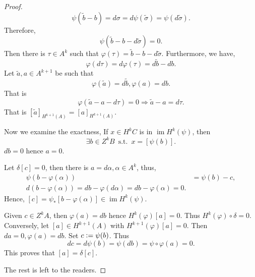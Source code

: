 \documentclass[8pt]{article}
\DeclareMathOperator{\straw}{s.t.}
\DeclareMathOperator{\image}{im}
\newcommand{\defeq}{\vcentcolon=}
\newcommand{\st}[0]{\:\straw\:}
\begin{document}
\begin{proof}
\begin{equation*}
    \psi(\tilde{b}-b) = d\sigma = d\psi(\tilde{\sigma}) = \psi(d\tilde{\sigma}).
  \end{equation*}
  Therefore,
  \begin{equation*}
    \psi(\tilde{b}-b-d\tilde{\sigma})=0.
  \end{equation*}
  Then there is $\tau\in A^k$ such that $\varphi(\tau) = \tilde{b}-b-d\tilde{\sigma}$. Furthermore, we have,
  \begin{equation*}
    \varphi(d\tau) = d\varphi(\tau)=d\tilde{b}-db.
  \end{equation*}
  Let $\tilde{a},a\in A^{k+1}$ be such that 
  \begin{equation*}
    \varphi(\tilde{a}) = d\tilde{b},\varphi(a) = db.
  \end{equation*}
  That is 
  \begin{equation*}
    \varphi(\tilde{a}-a-d\tau) = 0\Rightarrow \tilde{a}-a = d\tau.
  \end{equation*}
  That is $[\tilde{a}]_{H^{k+1}(A)} = [a]_{H^{k+1}(A)}$. 
  \par Now we examine the exactness,
  If $x\in H^kC$ is in $\image H^k(\psi)$, then 
  \begin{equation*}
    \exists b\in Z^kB\st x=[\psi(b)].
  \end{equation*}
  $db=0$ hence $a=0$.
  \par Let $\delta[c]=0$, then there is $a=d\alpha,\alpha\in A^k$, thus,
  \begin{align*}
    \psi(b-\varphi(\alpha))&=\psi(b)-c,\\
    d(b-\varphi(\alpha))=db-\varphi(d\alpha)=db-\varphi(\alpha)=0.
  \end{align*}
  Hence, $[c]=\psi_*[b-\varphi(\alpha)]\in \image H^k(\psi)$.
  \par Given $c\in Z^kA$, then $\varphi(a)=db$ hence $H^k(\varphi)[a]=0$. Thus $H^k(\varphi)\circ\delta=0$.
  Conversely, let $[a]\in H^{k+1}(A)$ with $H^{k+1}(\varphi)[a]=0$. Then $da = 0,\varphi(a) = db$. Set $c\defeq\psi(b)$. Thus 
  \begin{equation*}
    dc = d\psi(b)=\psi(db)=\psi\circ\varphi(a)=0.
  \end{equation*}
  This proves that $[a]=\delta[c]$.
  \par The rest is left to the readers.
\end{proof}
\end{document}
